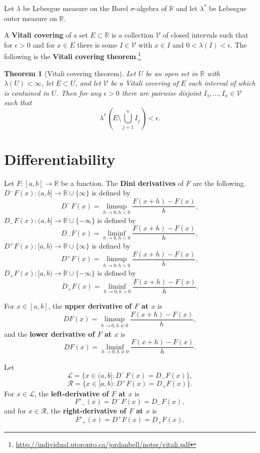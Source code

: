 \documentclass{article}
\newtheorem{theorem}{Theorem}
\theoremstyle{definition}
\begin{document}
Let
$\lambda$ be Lebesgue measure on the Borel $\sigma$-algebra of $\mathbb{R}$ and
let $\lambda^*$ be Lebesgue outer measure on $\mathbb{R}$.

A \textbf{Vitali covering} of a set $E \subset \mathbb{R}$ is a collection $\mathcal{V}$ 
of  closed intervals such that for $\epsilon>0$ and for $x \in E$ there is some $I \in \mathcal{V}$ 
with $x \in I$ and
$0<\lambda(I)<\epsilon$. The following is the \textbf{Vitali covering theorem}.\footnote{\url{http://individual.utoronto.ca/jordanbell/notes/vitali.pdf}}

\begin{theorem}[Vitali covering theorem]
Let $U$ be an open set in $\mathbb{R}$ with $\lambda(U)<\infty$, let
$E \subset U$, and let $\mathcal{V}$ be a Vitali covering of $E$ each interval of which is contained in $U$. Then for any $\epsilon>0$ there
are pairwise disjoint $I_1,\ldots,I_n \in \mathcal{V}$ such that 
\[
\lambda^*\left(E \setminus \bigcup_{j=1}^n I_j \right)< \epsilon.
\]
\end{theorem}









\section{Differentiability}
Let $F:[a,b]  \to \mathbb{R}$ be a function.
The \textbf{Dini derivatives} of $F$ are the following. 
 $D^- F(x):(a,b] \to \mathbb{R} \cup \{\infty\}$ is defined by
\[
D^-F(x) = \limsup_{h \to 0, h<0} \frac{F(x+h)-F(x)}{h},
\]
 $D_-F(x):(a,b] \to \mathbb{R} \cup \{-\infty\}$ is defined by
\[
D_-F(x) = \liminf_{h \to 0, h<0} \frac{F(x+h)-F(x)}{h},
\]
$D^+F(x):[a,b) \to \mathbb{R} \cup \{\infty\}$ is defined by
\[
D^+F(x) = \limsup_{h \to 0, h>0}  \frac{F(x+h)-F(x)}{h},
\]
$D_+F(x):[a,b) \to \mathbb{R} \cup \{-\infty\}$ is defined by
\[
D_+F(x) = \liminf_{h \to 0, h>0}\frac{F(x+h)-F(x)}{h}.
\]


For $x \in [a,b]$, the \textbf{upper derivative of $F$ at $x$} is
\[
\overline{D}F(x) = \limsup_{h \to 0, h \neq 0} \frac{F(x+h)-F(x)}{h},
\]
and  the \textbf{lower derivative of $F$ at $x$} is 
\[
\underline{D}F(x) = \liminf_{h \to 0, h \neq 0} \frac{F(x+h)-F(x)}{h}.
\]


Let
\[
\mathscr{L}=\{x \in (a,b]: D^-F(x)=D_-F(x)\},
\]
\[
\mathscr{R}=\{x \in [a,b): D^+F(x)=D_+F(x)\}.
\]
For $x \in \mathscr{L}$, the \textbf{left-derivative of $F$ at $x$} is
\[
F'_-(x)=D^-F(x)=D_-F(x),
\]
and for $x \in \mathscr{R}$, the  \textbf{right-derivative of $F$ at $x$} is
\[
F'_+(x)=D^+F(x)=D_+F(x).
\]
\end{document}
